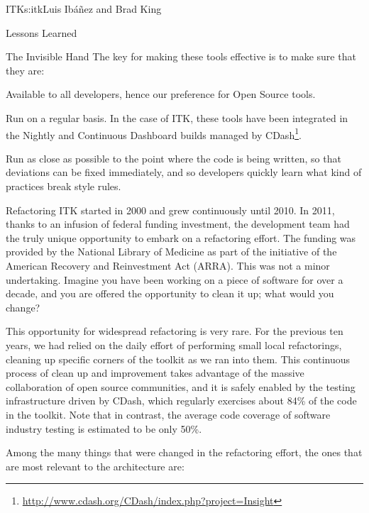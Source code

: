 \begin{aosachapter}{ITK}{s:itk}{Luis Ib\'{a}\~{n}ez and Brad King}
\begin{aosasect1}{Lessons Learned}
\begin{aosasect2}{The Invisible Hand}
The key for making these tools effective is to make sure that they are:
\begin{aosaitemize}
\item Available to all developers, hence our preference for Open Source tools.
\item Run on a regular basis. In the case of ITK, these tools have been
integrated in the Nightly and Continuous Dashboard builds managed by
CDash\footnote{\url{http://www.cdash.org/CDash/index.php?project=Insight}}.
\item Run as close as possible to the point where the code is being written,
so that deviations can be fixed immediately, and so developers
quickly learn what kind of practices break style rules.
\end{aosaitemize}

\end{aosasect2}

\begin{aosasect2}{Refactoring}
ITK started in 2000 and grew continuously until 2010. In
2011, thanks to an infusion of federal funding investment, the development team
had the truly unique opportunity to embark on a refactoring effort. The funding
was provided by the National Library of Medicine as part of the initiative of
the American Recovery and Reinvestment Act (ARRA). This was not a minor undertaking.
Imagine you have been working on a piece of software for over a decade, and you
are offered the opportunity to clean it up; what would you change?

This opportunity for widespread refactoring is very rare. For the previous ten
years, we had relied on the daily effort of performing small local
refactorings, cleaning up specific corners of the toolkit as we ran into
them.  This continuous process of clean up and improvement takes advantage of
the massive collaboration of open source communities, and it is safely enabled
by the testing infrastructure driven by CDash, which regularly exercises
about 84\% of the code in the toolkit. Note that in contrast, the average
code coverage of software industry testing is estimated to be only 50\%.

Among the many things that were changed in the refactoring effort, the ones
that are most relevant to the architecture are:


\end{aosasect2}
\end{aosasect1}
\end{aosachapter}
